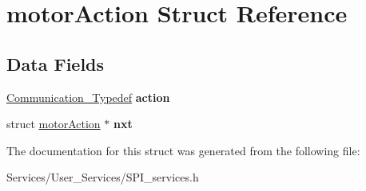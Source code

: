 \hypertarget{structmotor_action}{}\section{motor\+Action Struct Reference}
\label{structmotor_action}
\subsection*{Data Fields}
\begin{DoxyCompactItemize}
\item 
\mbox{\label{structmotor_action_af13cf3ed13498241f506181c965221e7}} 
\hyperlink{struct_communication___typedef}{Communication\+\_\+\+Typedef} {\bfseries action}
\item 
\mbox{\label{structmotor_action_a9a8fcc97b638a341da9896c375b55aee}} 
struct \hyperlink{structmotor_action}{motor\+Action} $\ast$ {\bfseries nxt}
\end{DoxyCompactItemize}


The documentation for this struct was generated from the following file\+:\begin{DoxyCompactItemize}
\item 
Services/\+User\+\_\+\+Services/S\+P\+I\+\_\+services.\+h\end{DoxyCompactItemize}
